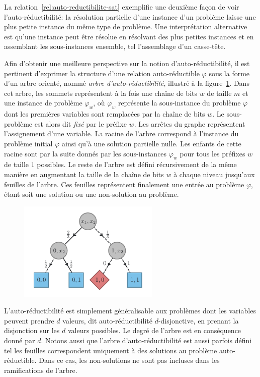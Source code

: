 La relation~\ref{rel:auto-reductibilite-sat} exemplifie une deuxième façon de voir l'auto-réductibilité: la résolution partielle d'une instance d'un problème laisse une plus petite instance du même type de problème. Une interprétation alternative est qu'une instance peut être résolue en résolvant des plus petites instances et en assemblant les sous-instances ensemble, tel l'assemblage d'un casse-tête. 

Afin d'obtenir une meilleure perspective sur la notion d'auto-réductibilité, il est pertinent d'exprimer la structure d'une relation auto-réductible $\varphi$ sous la forme d'un arbre orienté, nommé \textit{arbre d'auto-réductibilité}, illustré à la figure~\ref{fig:arbre-auto-reductibilite}. Dans cet arbre, les sommets représentent à la fois une chaîne de bits $w$ de taille $m$ et une instance de problème $\varphi_{w}$, où $\varphi_{w}$ représente la sous-instance du problème $\varphi$ dont les premières variables sont remplacées par la chaîne de bits $w$. Le sous-problème est alors dit \textit{fixé} par le préfixe $w$. Les arrêtes du graphe représentent l'assignement d'une variable. La racine de l'arbre correspond à l'instance du problème initial $\varphi$ ainsi qu'à une solution partielle nulle. Les enfants de cette racine sont par la suite donnés par les sous-instances $\varphi_{w}$ pour tous les préfixes $w$ de taille $1$ possibles. Le reste de l'arbre est défini récursivement de la même manière en augmentant la taille de la chaîne de bits $w$ à chaque niveau jusqu'aux feuilles de l'arbre. Ces feuilles représentent finalement une entrée au problème $\varphi$, étant soit une solution ou une non-solution au problème.
\begin{figure}[ht!]
    \centering
    \includegraphics[width=0.6\textwidth]{figures/jvv-algorithm.pdf}
    \caption[Arbre d'auto-réductibilité]{}
    \label{fig:arbre-auto-reductibilite}
\end{figure}
L'auto-réductibilité est simplement généralisable aux problèmes dont les variables peuvent prendre $d$ valeurs, dit auto-réductibilité $d$-disjonctive, en prenant la disjonction sur les $d$ valeurs possibles. Le degré de l'arbre est en conséquence donné par $d$. Notons aussi que l'arbre d'auto-réductibilité est aussi parfois défini tel les feuilles correspondent uniquement à des solutions au problème auto-réductible. Dans ce cas, les non-solutions ne sont pas incluses dans les ramifications de l'arbre.

